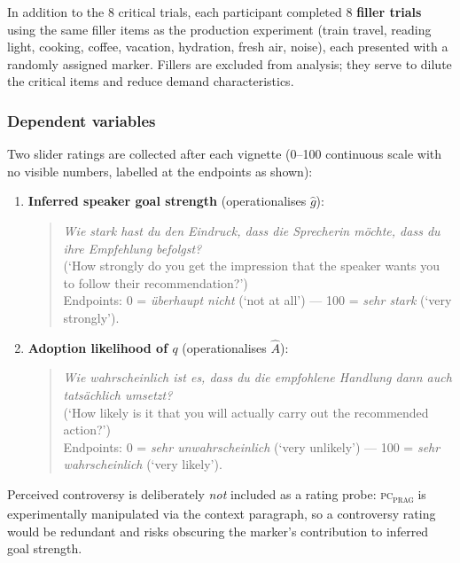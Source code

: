 \documentclass[12pt]{article}
\begin{document}
In addition to the 8 critical trials, each participant completed 8
\textbf{filler trials} using the same filler items as the production
experiment (train travel, reading light, cooking, coffee, vacation,
hydration, fresh air, noise), each presented with a randomly assigned
marker.
Fillers are excluded from analysis; they serve to dilute the critical
items and reduce demand characteristics.

\subsubsection{Dependent variables}
\label{subsub:dvs_comp}

Two slider ratings are collected after each vignette (0--100 continuous
scale with no visible numbers, labelled at the endpoints as shown):

\begin{enumerate}
  \item \textbf{Inferred speaker goal strength} (operationalises $\widehat{g}$):
  \begin{quote}
    \textit{Wie stark hast du den Eindruck, dass die Sprecherin m\"ochte,
    dass du ihre Empfehlung befolgst?}\\
    (`How strongly do you get the impression that the speaker wants you to
    follow their recommendation?')\\
    Endpoints: 0 = \textit{\"uberhaupt nicht}
    (`not at all') ---
    100 = \textit{sehr stark} (`very strongly').
  \end{quote}

  \item \textbf{Adoption likelihood of $q$} (operationalises $\widehat{A}$):
  \begin{quote}
    \textit{Wie wahrscheinlich ist es, dass du die empfohlene Handlung
    dann auch tats\"achlich umsetzt?}\\
    (`How likely is it that you will actually carry out the recommended
    action?')\\
    Endpoints: 0 = \textit{sehr unwahrscheinlich}
    (`very unlikely') ---
    100 = \textit{sehr wahrscheinlich} (`very likely').
  \end{quote}
\end{enumerate}

\noindent Perceived controversy is deliberately \emph{not} included as a
rating probe: \textsc{pc\textsubscript{prag}} is experimentally
manipulated via the context paragraph, so a controversy rating would
be redundant and risks obscuring the marker's contribution to inferred
goal strength.
\end{document}
